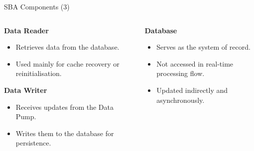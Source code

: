 \documentclass[aspectratio=169, table]{beamer}
\begin{document}
	\begin{frame}{SBA Components (3)}
		\vspace{20pt}
		\begin{columns}[t]
			\begin{column}{0.5\textwidth}
				\textbf{Data Reader}
				\begin{itemize}
					\item Retrieves data from the database.
					\item Used mainly for cache recovery or reinitialisation.
				\end{itemize}
				
				\textbf{Data Writer}
				\begin{itemize}
					\item Receives updates from the Data Pump.
					\item Writes them to the database for persistence.
				\end{itemize}
			\end{column}
			
			\begin{column}{0.5\textwidth}
				\textbf{Database}
				\begin{itemize}
					\item Serves as the system of record.
					\item Not accessed in real-time processing flow.
					\item Updated indirectly and asynchronously.
				\end{itemize}
			\end{column}
		\end{columns}
	\end{frame}
	
\end{document}
